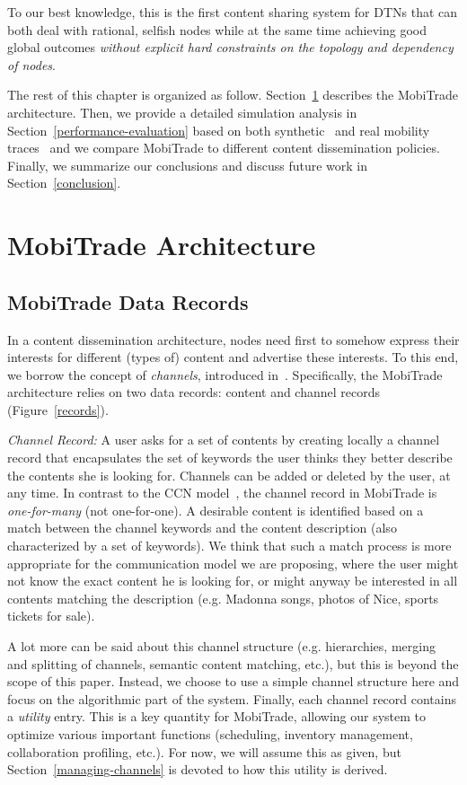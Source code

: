 To our best knowledge, this is the first content sharing system for DTNs that can both deal with rational, selfish nodes while at the same time achieving good global outcomes \emph{without explicit hard constraints on the topology and dependency of nodes}. 

The rest of this chapter is organized as follow. Section~\ref{MobiTrade-architecture} describes the MobiTrade architecture. Then, we provide a detailed simulation analysis in Section~\ref{performance-evaluation} based on both synthetic~\cite{HCMM} and real mobility traces~\cite{KAIST} and we compare MobiTrade to different content dissemination policies. Finally, we summarize our conclusions and discuss future work in Section~\ref{conclusion}.


\section{MobiTrade Architecture}
\label{MobiTrade-architecture}
\subsection{MobiTrade Data Records}
\label{content-channel-records}

In a content dissemination architecture, nodes need first to somehow express their interests for different (types of) content and advertise these interests. To this end, we borrow the concept of \emph{channels}, introduced in~\cite{May07wirelessopportunistic}. Specifically, the MobiTrade architecture relies on two data records: content and channel records (Figure~\ref{records}).

\emph{Channel Record:} A user asks for a set of contents by creating locally a channel record that encapsulates the set of keywords the user thinks they better describe the contents she is looking for. Channels can be added or deleted by the user, at any time. In contrast to the CCN model~\cite{CCN}, the channel record in MobiTrade is \emph{one-for-many} (not one-for-one). A desirable content is identified based on a match between the channel keywords and the content description (also characterized by a set of keywords). We think that such a match process is more appropriate for the communication model we are proposing, where the user might not know the exact content he is looking for, or might anyway be interested in all contents matching the description (e.g. Madonna songs, photos of Nice, sports tickets for sale). 

A lot more can be said about this channel structure (e.g. hierarchies, merging and splitting of channels, semantic content matching, etc.), but this is beyond the scope of this paper. Instead, we choose to use a simple channel structure here and focus on the algorithmic part of the system. Finally, each channel record contains a \emph{utility} entry. This is a key quantity for MobiTrade, allowing our system to optimize various important functions (scheduling, inventory management, collaboration profiling, etc.). For now, we will assume this as given, but Section~\ref{managing-channels} is devoted to how this utility is derived.

